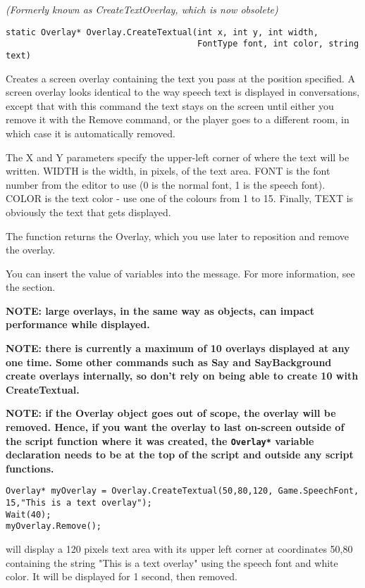 \it{(Formerly known as CreateTextOverlay, which is now obsolete)}

\begin{verbatim}
static Overlay* Overlay.CreateTextual(int x, int y, int width,
                                      FontType font, int color, string text)
\end{verbatim}
Creates a screen overlay containing the text you pass at the position
specified. A screen overlay looks identical to the way speech text is
displayed in conversations, except that with this command the text stays
on the screen until either you remove it with the Remove command, or the player
goes to a different room, in which case it is automatically removed.

The X and Y parameters specify the upper-left corner of where the text
will be written. WIDTH is the width, in pixels, of the text area. FONT is
the font number from the editor to use (0 is the normal font, 1 is the speech
font). COLOR is the text color - use one of the colours from 1 to 15.
Finally, TEXT is obviously the text that gets displayed.

The function returns the Overlay, which you use later to reposition
and remove the overlay.

You can insert the value of variables into the message. For more information,
see the  section.

\bf{NOTE:} large overlays, in the same way as objects, can impact performance
while displayed.

\bf{NOTE:} there is currently a maximum of 10 overlays displayed at any one time. Some other
commands such as Say and SayBackground create overlays internally,
so don't rely on being able to create 10 with CreateTextual.

\bf{NOTE:} if the Overlay object goes out of scope, the overlay will be removed. Hence,
if you want the overlay to last on-screen outside of the script function where it
was created, the \verb$Overlay*$ variable declaration needs to be at the top of
the script and outside any script functions.

\begin{verbatim}
Overlay* myOverlay = Overlay.CreateTextual(50,80,120, Game.SpeechFont, 15,"This is a text overlay");
Wait(40);
myOverlay.Remove();
\end{verbatim}
will display a 120 pixels text area with its upper left corner at coordinates 50,80
containing the string "This is a text overlay" using the speech font and white color.
It will be displayed for 1 second, then removed.

